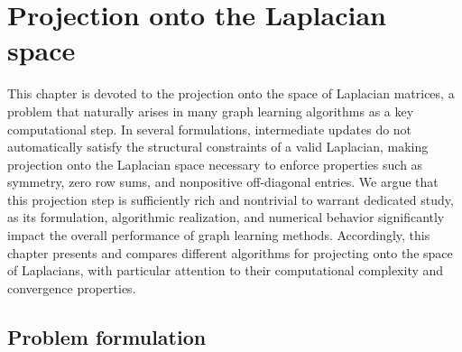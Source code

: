 \blankpage

\chapter{Projection onto the Laplacian space}

This chapter is devoted to the projection onto the space of Laplacian matrices, a problem that naturally arises in many graph learning algorithms as a key computational step. In several formulations, intermediate updates do not automatically satisfy the structural constraints of a valid Laplacian, making projection onto the Laplacian space necessary to enforce properties such as symmetry, zero row sums, and nonpositive off-diagonal entries. We argue that this projection step is sufficiently rich and nontrivial to warrant dedicated study, as its formulation, algorithmic realization, and numerical behavior significantly impact the overall performance of graph learning methods. Accordingly, this chapter presents and compares different algorithms for projecting onto the space of Laplacians, with particular attention to their computational complexity and convergence properties.

\section{Problem formulation}

